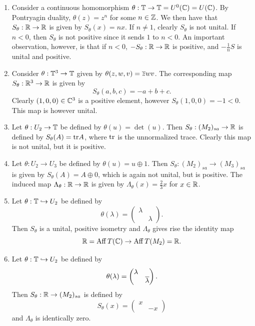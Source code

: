 \documentclass[12pt]{amsart}
\begin{document}
\begin{example}\label{example:nonpositive-example}\mbox{}
\begin{enumerate}
\item Consider a continuous homomorphism $\theta: \mathbb{T} \to \mathbb{T} = U^0(\mathbb{C}) = U(\mathbb{C})$. By Pontryagin duality, $\theta(z) = z^n$ for some $n \in \mathbb{Z}$. We then have that $S_\theta: \mathbb{R} \to \mathbb{R}$ is given by $S_\theta(x) = nx$. If $n \neq 1$, clearly $S_\theta$ is not unital. If $n < 0$, then $S_\theta$ is not positive since it sends $1$ to $n < 0$. An important observation, however, is that if $n < 0$, $-S_\theta: \mathbb{R} \to \mathbb{R}$ is positive, and $-\frac{1}{n}S$ is unital and positive.
\item Consider $\theta: \mathbb{T}^3 \to \mathbb{T}$ given by $\theta(z,w,v) = \overline{z}wv$. The corresponding map $S_\theta: \mathbb{R}^3 \to \mathbb{R}$ is given by
\begin{equation}
S_\theta(a,b,c) = -a + b + c.
\end{equation}
Clearly $(1,0,0) \in \mathbb{C}^3$ is a positive element, however $S_\theta(1,0,0) = -1 < 0$. This map is however unital.
\item Let $\theta: U_2 \to \mathbb{T}$ be defined by $\theta(u) = \det(u)$. Then $S_\theta: (M_2)_{sa} \to \mathbb{R}$ is defined by $S_\theta(A) = \text{tr} A$, where $\text{tr}$ is the unnormalized trace. Clearly this map is not unital, but it is positive.
\item Let $\theta: U_2 \to U_3$ be defined by $\theta(u) = u \oplus 1$. Then $S_\theta: (M_2)_{sa} \to (M_3)_{sa}$ is given by $S_\theta(A) = A \oplus 0$, which is again not unital, but is positive. The induced map $\Lambda_\theta: \mathbb{R} \to \mathbb{R}$ is given by $\Lambda_\theta(x) = \frac{2}{3}x$ for $x \in \mathbb{R}$.
\item Let $\theta: \mathbb{T} \hookrightarrow U_2$ be defined by
\begin{equation}
\theta(\lambda) = \begin{pmatrix}
\lambda \\ & \lambda
\end{pmatrix}.
\end{equation}
Then $S_\theta$ is a unital, positive isometry and $\Lambda_\theta$ gives rise the identity map
\begin{equation}
\mathbb{R} = \operatorname{Aff} T(\mathbb{C})  \to \operatorname{Aff} T(M_2) = \mathbb{R}.
\end{equation}
\item Let $\theta: \mathbb{T} \hookrightarrow U_2$ be defined by
\begin{equation}
\theta(\lambda) =  \begin{pmatrix}
\lambda & \\ & \overline{\lambda}
\end{pmatrix}.
\end{equation}
Then $S_\theta: \mathbb{R} \to (M_2)_{sa}$ is defined by
\begin{equation}
S_\theta(x) = \begin{pmatrix}
x & \\ & -x
\end{pmatrix}
\end{equation}
and $\Lambda_\theta$ is identically zero. 
\end{enumerate}
\end{example}
\end{document}
